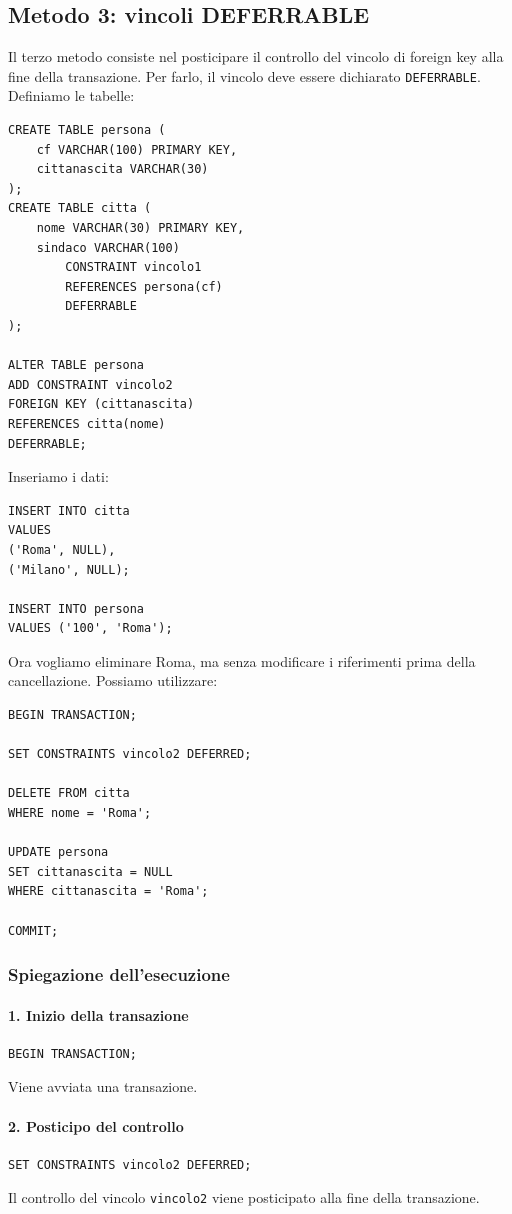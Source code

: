 \subsection{Metodo 3: vincoli DEFERRABLE}
Il terzo metodo consiste
nel posticipare il controllo
del vincolo di foreign key
alla fine della transazione.
Per farlo, il vincolo deve
essere dichiarato
\texttt{DEFERRABLE}.
Definiamo le tabelle:
\begin{verbatim}
CREATE TABLE persona (
    cf VARCHAR(100) PRIMARY KEY,
    cittanascita VARCHAR(30)
);
CREATE TABLE citta (
    nome VARCHAR(30) PRIMARY KEY,
    sindaco VARCHAR(100)
        CONSTRAINT vincolo1
        REFERENCES persona(cf)
        DEFERRABLE
);

ALTER TABLE persona
ADD CONSTRAINT vincolo2
FOREIGN KEY (cittanascita)
REFERENCES citta(nome)
DEFERRABLE;
\end{verbatim}
Inseriamo i dati:
\begin{verbatim}
INSERT INTO citta
VALUES
('Roma', NULL),
('Milano', NULL);

INSERT INTO persona
VALUES ('100', 'Roma');
\end{verbatim}
Ora vogliamo eliminare Roma,
ma senza modificare i riferimenti
prima della cancellazione.
Possiamo utilizzare:
\begin{verbatim}
BEGIN TRANSACTION;

SET CONSTRAINTS vincolo2 DEFERRED;

DELETE FROM citta
WHERE nome = 'Roma';

UPDATE persona
SET cittanascita = NULL
WHERE cittanascita = 'Roma';

COMMIT;
\end{verbatim}

\subsubsection{Spiegazione dell'esecuzione}
\paragraph{1. Inizio della transazione}
\begin{verbatim}
BEGIN TRANSACTION;
\end{verbatim}
Viene avviata una transazione.
\paragraph{2. Posticipo del controllo}
\begin{verbatim}
SET CONSTRAINTS vincolo2 DEFERRED;
\end{verbatim}
Il controllo del vincolo
\texttt{vincolo2} viene posticipato
alla fine della transazione.
